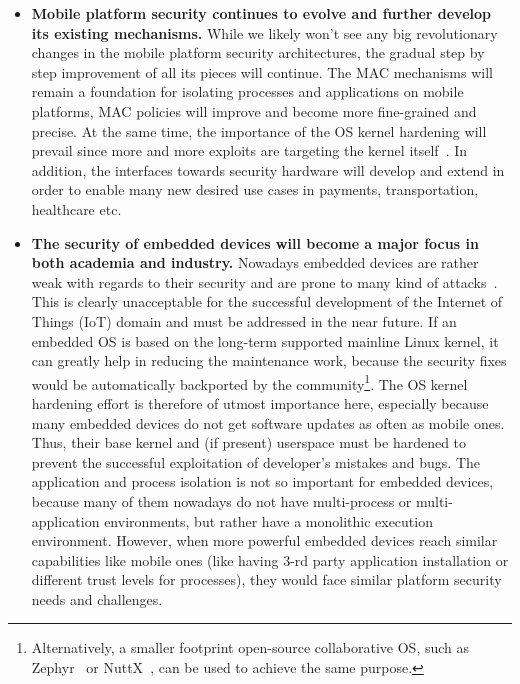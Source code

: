 \begin{itemize}
	\item \textbf{Mobile platform security continues to evolve and further develop its existing mechanisms.} While we likely won't see any big revolutionary changes in the mobile platform security architectures, the gradual step by step improvement of all its pieces will continue. The MAC mechanisms will remain a foundation for isolating processes and applications on mobile platforms, MAC policies will improve and become more fine-grained and precise. At the same time, the importance of the OS kernel hardening will prevail since more and more exploits are targeting the kernel itself~\cite{stoep2016android}. In addition, the interfaces towards security hardware will develop and extend in order to enable many new desired use cases in payments, transportation, healthcare etc.
		
	\item \textbf{The security of embedded devices will become a major focus in both academia and industry.} Nowadays embedded devices are rather weak with regards to their security and are prone to many kind of attacks~\cite{Choo2016}. This is clearly unacceptable for the successful development of the Internet of Things (IoT) domain and must be addressed in the near future. If an embedded OS is based on the long-term supported mainline Linux kernel, it can greatly help in reducing the maintenance work, because the security fixes would be automatically backported by the community\footnote{Alternatively, a smaller footprint open-source collaborative OS, such as Zephyr~\cite{zephyr} or NuttX~\cite{NuttX}, can be used to achieve the same purpose.}. The OS kernel hardening effort is therefore of utmost importance here, especially because many embedded devices do not get software updates as often as mobile ones. Thus, their base kernel and (if present) userspace must be hardened to prevent the successful exploitation of developer's mistakes and bugs. The application and process isolation is not so important for embedded devices, because many of them nowadays do not have multi-process or multi-application environments, but rather have a monolithic execution environment. However, when more powerful embedded devices reach similar capabilities like mobile ones (like having 3-rd party application installation or different trust levels for processes), they would face similar platform security needs and challenges.
	

\end{itemize}
